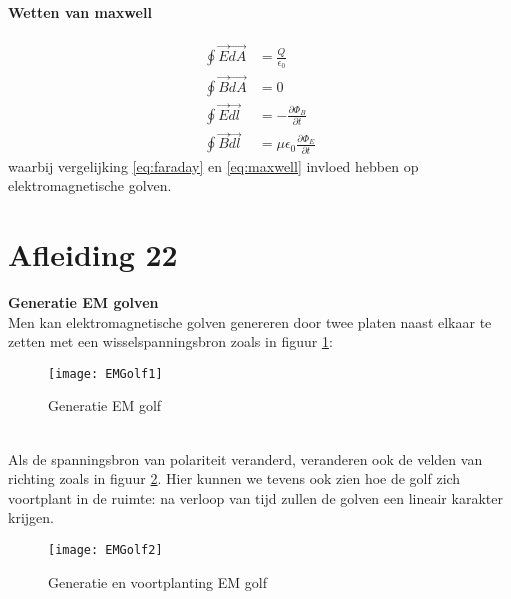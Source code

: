 \documentclass[a4paper,kul]{kulakarticle} %
\begin{document}
\paragraph{Wetten van maxwell}
\begin{align}
	\oint\vec{E}\vec{dA}&=\frac{Q}{\epsilon_0}\\
	\oint\vec{B}\vec{dA}&=0\\
	\label{eq:faraday}
	\oint\vec{E}\vec{dl}&=-\frac{\partial\Phi_B}{\partial t}\\
	\label{eq:maxwell}
	\oint\vec{B}\vec{dl}&=\mu\epsilon_0\frac{\partial\Phi_E}{\partial t}
\end{align}
waarbij vergelijking \ref{eq:faraday} en \ref{eq:maxwell} invloed hebben op elektromagnetische golven.
\newpage
\section{Afleiding 22}
\textbf{Generatie EM golven}\\
Men kan elektromagnetische golven genereren door twee platen naast elkaar te zetten met een wisselspanningsbron zoals in figuur \ref{fig:emgolf1}:
\begin{figure}[h]
	\centering
	\texttt{[image: EMGolf1]}
	\caption[Generatie]{Generatie EM golf}
	\label{fig:emgolf1}
\end{figure}\\
Als de spanningsbron van polariteit veranderd, veranderen ook de velden van richting zoals in figuur \ref{fig:emgolf2}. Hier kunnen we tevens ook zien hoe de golf zich voortplant in de ruimte: na verloop van tijd zullen de golven een lineair karakter krijgen. 
\begin{figure}[h]
	\centering
	\texttt{[image: EMGolf2]}
	\caption[Generatie en voortplanting]{Generatie en voortplanting EM golf}
	\label{fig:emgolf2}
\end{figure}
\newpage
\end{document}

